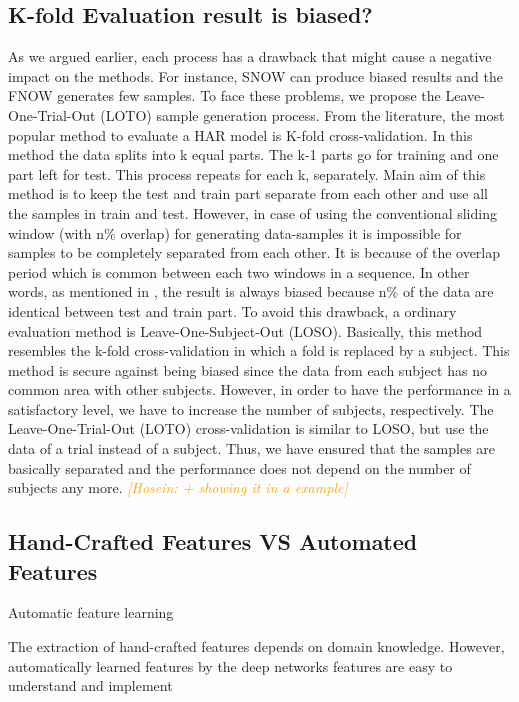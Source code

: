 \documentclass[journal,article,submit,moreauthors,pdftex]{Definitions/mdpi}
\newcommand{\hosein}[1]{\textcolor{orange}{{\it [Hosein: #1]}}}
\begin{document}
\subsection{K-fold Evaluation result is biased?}
As we argued earlier, each process has a drawback that might cause a negative impact on the methods. For instance, SNOW can produce biased results and the FNOW generates few samples. To face these problems, we propose the Leave-One-Trial-Out (LOTO) sample generation process.
From the literature, the most popular method to evaluate a HAR model is K-fold cross-validation. In this method the data splits into k equal parts. The k-1 parts go for training and one part left for test. This process repeats for each k, separately. Main aim of this method is to keep the test and train part separate from each other and use all the samples in train and test. However, in case of using the conventional sliding window (with n\% overlap) for generating data-samples it is impossible for samples to be completely separated from each other. It is because of the overlap period which is common between each two windows in a sequence. In other words, as mentioned in \cite{jordao2018human}, the result is always biased because n\% of the data are identical between test and train part. To avoid this drawback, a ordinary evaluation method is Leave-One-Subject-Out (LOSO). Basically, this method resembles the k-fold cross-validation in which a fold is replaced by a subject. This method is secure against being biased since the data from each subject has no common area with other subjects. However, in order to have the performance in a satisfactory level, we have to increase the number of subjects, respectively. The Leave-One-Trial-Out (LOTO) cross-validation\cite{jordao2018human} is similar to LOSO, but use the data of a trial instead of a subject. Thus, we have ensured that the samples are basically separated and the performance does not depend on the number of subjects any more.
\hosein{+ showing it in a example}

\subsection{Hand-Crafted Features VS Automated Features}

 Automatic feature learning

The extraction of hand-crafted features depends on domain knowledge. However, automatically learned features by the deep networks  features are
easy to understand and implement
\end{document}
